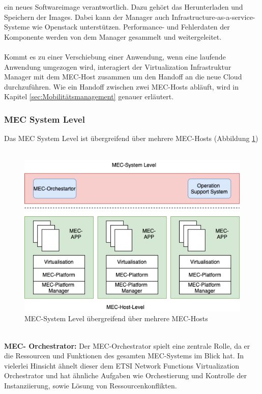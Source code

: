 \documentclass[runningheads]{llncs}
\numberwithin{figure}{section}
\begin{document}
ein neues Softwareimage verantwortlich. Dazu gehört das Herunterladen und Speichern der Images. Dabei kann der Manager auch 
Infrastructure-as-a-service-Systeme wie Openstack unterstützen. Performance- und Fehlerdaten der Komponente werden von dem Manager gesammelt und weitergeleitet.
\\
\\
Kommt es zu einer Verschiebung einer Anwendung, wenn eine laufende Anwendung umgezogen wird,
interagiert der Virtualization Infrastruktur Manager mit dem MEC-Host zusammen um den Handoff an die neue Cloud durchzuführen.
Wie ein Handoff zwischen zwei MEC-Hosts abläuft, wird in Kapitel \ref{sec:Mobilitätsmanagement} genauer erläutert.
\subsubsection{MEC System Level}
Das MEC System Level ist übergreifend über mehrere MEC-Hosts (Abbildung \ref{fig:mec-System-Level})
\\
\\
\begin{figure}
  \includegraphics[width=\linewidth]{images/mec-System-Level.png}
  \caption{MEC-System Level übergreifend über mehrere MEC-Hosts}
  \label{fig:mec-System-Level}
\end{figure}
\\
\textbf{MEC- Orchestrator:}
Der MEC-Orchestrator spielt eine zentrale Rolle, 
da er die Ressourcen und Funktionen des gesamten MEC-Systems im Blick hat. 
In vielerlei Hinsicht ähnelt dieser dem ETSI Network Functions Virtualization Orchestrator und hat ähnliche 
Aufgaben wie Orchestierung und Kontrolle der Instanziierung, sowie Lösung von Ressourcenkonflikten.
\end{document}
